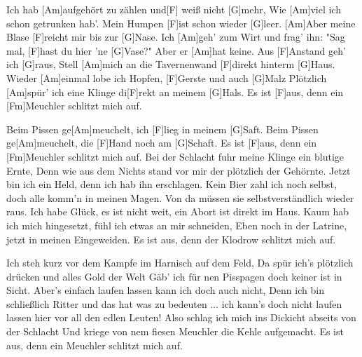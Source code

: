

\begin{guitar}
	
	Ich hab [Am]aufgehört zu zählen und[F] weiß nicht [G]mehr,
	Wie [Am]viel ich schon getrunken hab'. Mein Humpen [F]ist schon wieder [G]leer.
	[Am]Aber meine Blase [F]reicht mir bis zur [G]Nase.
	Ich [Am]geh' zum Wirt und frag' ihn: "Sag mal, [F]hast du hier 'ne [G]Vase?"
	Aber er [Am]hat keine. Aus [F]Anstand geh' ich [G]raus,
	Stell [Am]mich an die Tavernenwand [F]direkt hinterm [G]Haus.
	Wieder [Am]einmal lobe ich Hopfen, [F]Gerste und auch [G]Malz
	Plötzlich [Am]spür' ich eine Klinge di[F]rekt an meinem [G]Hals.
	Es ist [F]aus, denn ein [Fm]Meuchler schlitzt mich auf.
	
	Beim Pissen ge[Am]meuchelt, ich [F]lieg in meinem [G]Saft.
	Beim Pissen ge[Am]meuchelt, die [F]Hand noch am [G]Schaft.
	Es ist [F]aus, denn ein [Fm]Meuchler schlitzt mich auf.
	\tiny
	\footnotesize{}
	Bei der Schlacht fuhr meine Klinge ein blutige Ernte,
	Denn wie aus dem Nichts stand vor mir der plötzlich der Gehörnte.
	Jetzt bin ich ein Held, denn ich hab ihn erschlagen.
	Kein Bier zahl ich noch selbst, doch alle komm’n in meinen Magen.
	Von da müssen sie selbstverständlich wieder raus.
	Ich habe Glück, es ist nicht weit, ein Abort ist direkt im Haus.
	Kaum hab ich mich hingesetzt, fühl ich etwas an mir schneiden,
	Eben noch in der Latrine, jetzt in meinen Eingeweiden.
	Es ist aus, denn der Klodrow schlitzt mich auf.
	
	 
	
	Ich steh kurz vor dem Kampfe im Harnisch auf dem Feld,
	Da spür ich’s plötzlich drücken und alles Gold der Welt
	Gäb’ ich für nen Pisspagen doch keiner ist in Sicht.
	Aber’s einfach laufen lassen kann ich doch auch nicht,
	Denn ich bin schließlich Ritter und das hat was zu bedeuten
	... ich kann’s doch nicht laufen lassen hier vor all den edlen Leuten!
	Also schlag ich mich ins Dickicht abseits von der Schlacht
	Und kriege von nem fiesen Meuchler die Kehle aufgemacht.
	Es ist aus, denn ein Meuchler schlitzt mich auf.
	
	 
	

\end{guitar}
